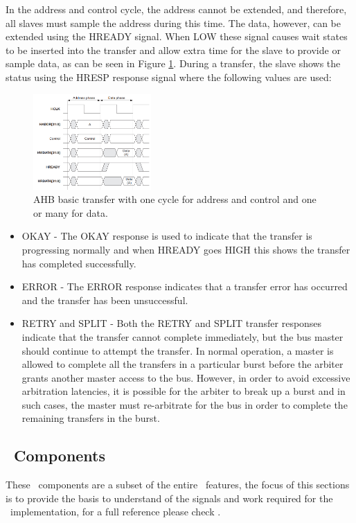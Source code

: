 In the address and control cycle, the address cannot be extended, and therefore, all slaves must sample the address during this time. The data, however, can be extended using the HREADY signal. When LOW these signal causes wait states to be inserted into the transfer and allow extra time for the slave to provide or sample data, as can be seen in Figure \ref{fig:basic_ahb_transfer}. During a transfer, the slave shows the status using the HRESP response signal where the  following values are used:
\begin{figure}[!ht]
    \centering
    \includegraphics[width=0.4\textwidth]{figures/others/simple_ahb_transfer.png}
    \caption{AHB basic transfer with one cycle for address and control and one or many for data.}
    \label{fig:basic_ahb_transfer}
\end{figure}

\begin{itemize}

\item  {OKAY -} The OKAY response is used to indicate that the transfer is progressing normally and when HREADY goes HIGH this shows the transfer has completed successfully.
\item {ERROR -} The ERROR response indicates that a transfer error has occurred and the transfer has been unsuccessful.
\item {RETRY and SPLIT  -} Both the RETRY and SPLIT transfer responses indicate that the transfer cannot complete immediately, but the bus master should continue to attempt the transfer. In normal operation, a master is allowed to complete all the transfers in a particular burst before the arbiter grants another master access to the bus. However, in order to avoid excessive arbitration latencies, it is possible for the arbiter to break up a burst and in such cases, the master must re-arbitrate for the bus in order to complete the remaining transfers in the burst.
\end{itemize}


\subsection{\amba~Components}
These \amba~components are a  subset of the entire \amba~features, the focus of this sections is to provide the basis to understand of the signals and work required for the \cshia~implementation, for a full reference please check \cite{ARMAMBA2}.

